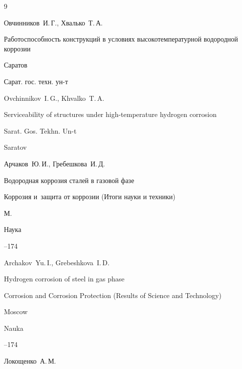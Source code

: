 \begin{thebibliography}{9}




\by Овчинников~И.\,Г., Хвалько~Т.\,А.

\book Работоспособность конструкций в условиях высокотемпературной водородной коррозии

\publaddr Саратов

\publ Сарат. гос. техн. ун-т



\misctransl

\by Ovchinnikov~I.\,G., Khvalko~T.\,A.

\book Serviceability of structures under high-temperature hydrogen corrosion

\publ Sarat. Gos. Tekhn. Un-t

\publaddr Saratov






\by Арчаков~Ю.\,И., Гребешкова~И.\,Д.

\paper Водородная коррозия сталей в газовой фазе

\inbook Коррозия и~защита от коррозии (Итоги науки и техники)

\publaddr М.

\publ Наука



--174

\misctransl 

\by Archakov~Yu.\,I., Grebeshkova~I.\,D.

\paper Hydrogen corrosion of steel in gas phase

\inbook Corrosion and Corrosion Protection (Results of Science and Technology)

\publaddr Moscow

\publ Nauka



--174






\by  Локощенко~А.\,М.


\end{thebibliography}
